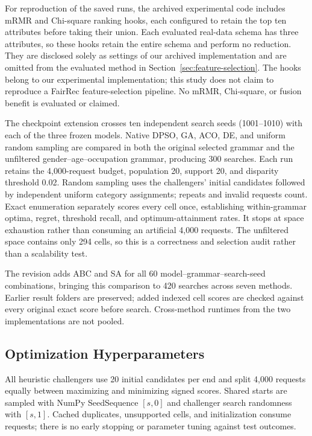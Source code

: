 \documentclass[sigconf,nonacm]{acmart}
\begin{document}
For reproduction of the saved runs, the archived experimental code includes mRMR and Chi-square ranking hooks, each configured to retain the top ten attributes before taking their union. Each evaluated real-data schema has three attributes, so these hooks retain the entire schema and perform no reduction. They are disclosed solely as settings of our archived implementation and are omitted from the evaluated method in Section~\ref{sec:feature-selection}. The hooks belong to our experimental implementation; this study does not claim to reproduce a FairRec feature-selection pipeline. No mRMR, Chi-square, or fusion benefit is evaluated or claimed.

The checkpoint extension crosses ten independent search seeds (1001--1010) with each of the three frozen models. Native DPSO, GA, ACO, DE, and uniform random sampling are compared in both the original selected grammar and the unfiltered gender--age--occupation grammar, producing 300 searches. Each run retains the 4,000-request budget, population 20, support 20, and disparity threshold 0.02. Random sampling uses the challengers' initial candidates followed by independent uniform category assignments; repeats and invalid requests count. Exact enumeration separately scores every cell once, establishing within-grammar optima, regret, threshold recall, and optimum-attainment rates. It stops at space exhaustion rather than consuming an artificial 4,000 requests. The unfiltered space contains only 294 cells, so this is a correctness and selection audit rather than a scalability test.

The revision adds ABC and SA for all 60 model--grammar--search-seed combinations, bringing this comparison to 420 searches across seven methods. Earlier result folders are preserved; added indexed cell scores are checked against every original exact score before search. Cross-method runtimes from the two implementations are not pooled.

\subsection{Optimization Hyperparameters}
All heuristic challengers use 20 initial candidates per end and split 4,000 requests equally between maximizing and minimizing signed scores. Shared starts are sampled with NumPy SeedSequence $[s,0]$ and challenger search randomness with $[s,1]$. Cached duplicates, unsupported cells, and initialization consume requests; there is no early stopping or parameter tuning against test outcomes.
\end{document}
